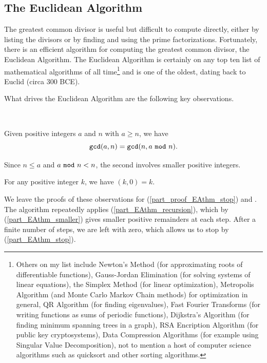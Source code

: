 \newcommand{\subea}{The Euclidean Algorithm}
\subsection{\subea}
\label{sub_euclidean_alg}

The greatest common divisor is useful but difficult to compute directly, either by listing the divisors or by finding and using the prime factorizations.  Fortunately, there is an efficient algorithm for computing the greatest common divisor, the Euclidean Algorithm.
The Euclidean Algorithm is certainly on any top ten list of mathematical algorithms of all time\footnote{Others on my list include Newton's Method (for approximating roots of differentiable functions), Gauss-Jordan Elimination (for solving systems of linear equations), the Simplex Method (for linear optimization), Metropolis Algorithm (and Monte Carlo Markov Chain methods) for optimization in general, QR Algorithm (for finding eigenvalues), Fast Fourier Transforms (for writing functions as sums of periodic functions), Dijkstra's Algorithm (for finding minimum spanning trees in a graph), RSA Encription Algorithm (for public key cryptosystems), Data Compression Algorithms (for example using Singular Value Decomposition), not to mention a host of computer science algorithms such as quicksort and other sorting algorithms.} and is one of the oldest, dating back to Euclid (circa 300 BCE).  

What drives the Euclidean Algorithm are the following key observations.

\begin{thm}
\label{thm_Euclidean_algorithm}
~
    \begin{apart}
        \item \label{part_EAthm_recursion} Given positive integers $a$ and $n$ with $a \ge n$, we have $$\texttt{gcd}(a,n) = \texttt{gcd}(n,a ~\texttt{mod}~ n).$$ 
        \item \label{part_EAthm_smaller} Since $n \le a$ and $a ~\texttt{mod}~ n < n$, the second  involves smaller positive integers.
        \item \label{part_EAthm_stop} For any positive integer $k$, we have $(k,0)=k$.
    \end{apart}
\end{thm}

We leave the proofs of these observations for (\ref{part_proof_EAthm_stop}) and .   The algorithm repeatedly applies  (\ref{part_EAthm_recursion}), which by (\ref{part_EAthm_smaller}) gives smaller positive remainders at each step.  After a finite number of steps, we are left with zero, which allows us to stop by (\ref{part_EAthm_stop}).

